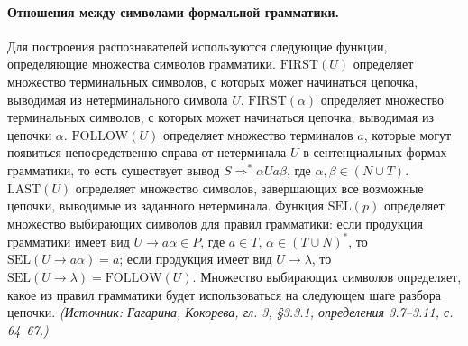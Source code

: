 \documentclass[a4paper,12pt]{article}
\begin{document}
\paragraph{Отношения между символами формальной грамматики.}
Для построения распознавателей используются следующие функции, определяющие множества символов грамматики. \(\mathrm{FIRST}(U)\) определяет множество терминальных символов, с которых может начинаться цепочка, выводимая из нетерминального символа \(U\). \(\mathrm{FIRST}(\alpha)\) определяет множество терминальных символов, с которых может начинаться цепочка, выводимая из цепочки \(\alpha\). \(\mathrm{FOLLOW}(U)\) определяет множество терминалов \(a\), которые могут появиться непосредственно справа от нетерминала \(U\) в сентенциальных формах грамматики, то есть существует вывод \(S\Rightarrow^*\alpha Ua\beta\), где \(\alpha,\beta\in(N\cup T)\). \(\mathrm{LAST}(U)\) определяет множество символов, завершающих все возможные цепочки, выводимые из заданного нетерминала. Функция \(\mathrm{SEL}(p)\) определяет множество выбирающих символов для правил грамматики: если продукция грамматики имеет вид \(U\to a\alpha\in P\), где \(a\in T\), \(\alpha\in(T\cup N)^*\), то \(\mathrm{SEL}(U\to a\alpha)=a\); если продукция имеет вид \(U\to\lambda\), то \(\mathrm{SEL}(U\to\lambda)=\mathrm{FOLLOW}(U)\). Множество выбирающих символов определяет, какое из правил грамматики будет использоваться на следующем шаге разбора цепочки.
\textit{(Источник: Гагарина, Кокорева, гл. 3, §3.3.1, определения 3.7--3.11, с. 64--67.)}
\end{document}
